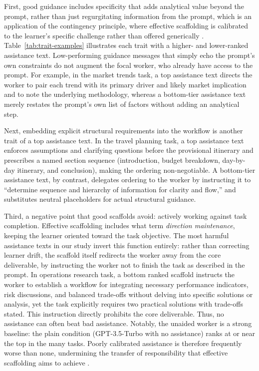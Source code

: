 %



First, good guidance includes specificity that adds analytical value beyond the prompt, rather than just regurgitating information from the prompt, which is an application of the contingency principle, where effective scaffolding is calibrated to the learner's specific challenge rather than offered generically \citep{vandepol2010}. Table~\ref{tab:trait-examples} illustrates each trait with a higher- and lower-ranked assistance text. Low-performing guidance messages that simply echo the prompt's own constraints do not augment the focal worker, who already have access to the prompt. For example, in the market trends task, a top assistance text directs the worker to pair each trend with its primary driver and likely market implication and to note the underlying methodology, whereas a bottom-tier assistance text merely restates the prompt's own list of factors without adding an analytical step.

Next, embedding explicit structural requirements into the workflow is another trait of a top assistance text. In the travel planning task, a top assistance text enforces assumptions and clarifying questions before the provisional itinerary and prescribes a named section sequence (introduction, budget breakdown, day-by-day itinerary, and conclusion), making the ordering non-negotiable. A bottom-tier assistance text, by contrast, delegates ordering to the worker by instructing it to ``determine sequence and hierarchy of information for clarity and flow,'' and substitutes neutral placeholders for actual structural guidance.

Third, a negative point that good scaffolds avoid: actively working against task completion. Effective scaffolding includes what \citet{wood1976} term \textit{direction maintenance}, keeping the learner oriented toward the task objective. The most harmful assistance texts in our study invert this function entirely: rather than correcting learner drift, the scaffold itself redirects the worker away from the core deliverable, by instructing the worker not to finish the task as described in the prompt. In operations research task, a bottom ranked scaffold instructs the worker to establish a workflow for integrating necessary performance indicators, risk discussions, and balanced trade-offs without delving into specific solutions or analysis, yet the task explicitly requires two practical solutions with trade-offs stated. This instruction directly prohibits the core deliverable. Thus, no assistance can often beat bad assistance. Notably, the unaided worker is a strong baseline: the plain condition (GPT-3.5-Turbo with no assistance) ranks at or near the top in the many tasks. Poorly calibrated assistance is therefore frequently worse than none, undermining the transfer of responsibility that effective scaffolding aims to achieve \citep{vandepol2010}.

